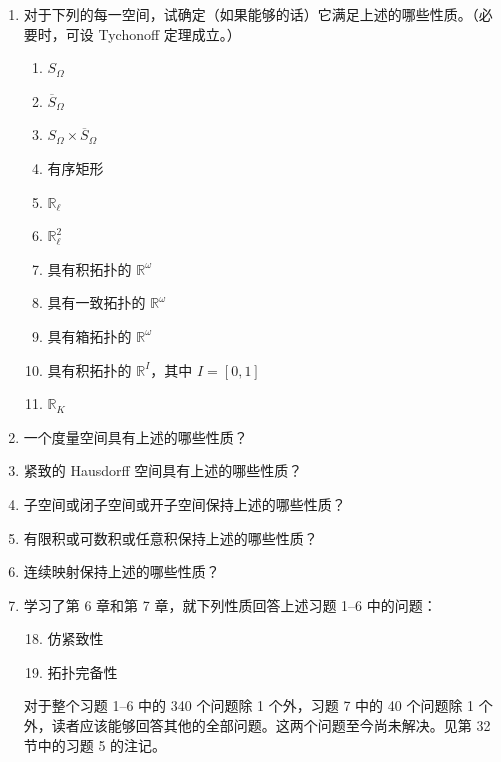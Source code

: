 \begin{enumerate}
\item 对于下列的每一空间，试确定（如果能够的话）它满足上述的哪些性质。（必要时，可设 Tychonoff 定理成立。）
\begin{enumerate}
\item $S_{\Omega}$
\item $\overline{S}_{\Omega}$
\item $S_{\Omega}\times\overline{S}_{\Omega}$
\item 有序矩形
\item $\mathbb{R}_{\ell}$
\item $\mathbb{R}_{\ell}^{2}$
\item 具有积拓扑的 $\mathbb{R}^{\omega}$
\item 具有一致拓扑的 $\mathbb{R}^{\omega}$
\item 具有箱拓扑的 $\mathbb{R}^{\omega}$
\item 具有积拓扑的 $\mathbb{R}^{I}$，其中 $I=[0,1]$
\item $\mathbb{R}_{K}$
\end{enumerate}
\item 一个度量空间具有上述的哪些性质？
\item 紧致的 Hausdorff 空间具有上述的哪些性质？
\item 子空间或闭子空间或开子空间保持上述的哪些性质？
\item 有限积或可数积或任意积保持上述的哪些性质？
\item 连续映射保持上述的哪些性质？
\item 学习了第 6 章和第 7 章，就下列性质回答上述习题 1--6 中的问题：
\begin{enumerate}
\setcounter{enumii}{17}
\item 仿紧致性
\item 拓扑完备性
\end{enumerate}
对于整个习题 1--6 中的 340 个问题除 1 个外，习题 7 中的 40 个问题除 1 个外，读者应该能够回答其他的全部问题。这两个问题至今尚未解决。见第 32 节中的习题 5 的注记。
\end{enumerate}